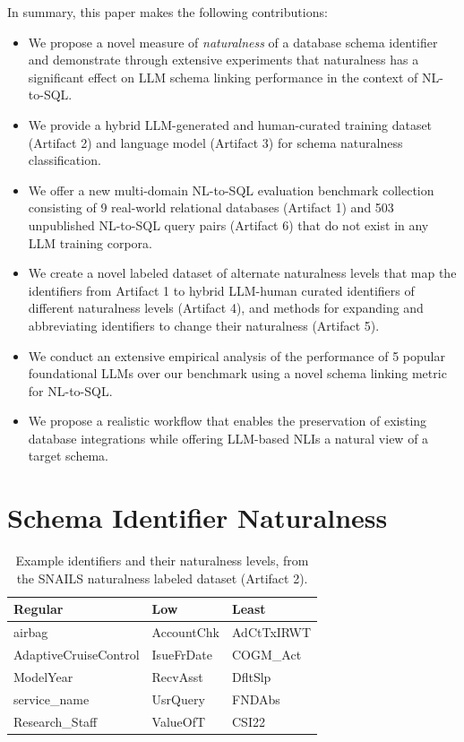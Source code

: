 In summary, this paper makes the following contributions:
\begin{itemize}
  \item We propose a novel measure of \emph{naturalness} of a database schema identifier and demonstrate through extensive experiments that naturalness has a significant effect on LLM schema linking performance in the context of NL-to-SQL.
  \item We provide a hybrid LLM-generated and human-curated training dataset (Artifact 2) and language model (Artifact 3) for schema naturalness classification.
  \item We offer a new multi-domain NL-to-SQL evaluation benchmark collection consisting of 9 real-world relational databases (Artifact 1) and 503 unpublished NL-to-SQL query pairs (Artifact 6) that do not exist in any LLM training corpora.
  \item We create a novel labeled dataset of alternate naturalness levels that map the identifiers from Artifact 1 to hybrid LLM-human curated identifiers of different naturalness levels (Artifact 4), and methods for expanding and abbreviating identifiers to change their naturalness (Artifact 5).
  \item We conduct an extensive empirical analysis of the performance of 5 popular foundational LLMs over our benchmark using a novel schema linking metric for NL-to-SQL.
  \item We propose a realistic workflow that enables the preservation of existing database integrations while offering LLM-based NLIs a natural view of a target schema.
\end{itemize}



\section{Schema Identifier Naturalness}


\begin{table}[t]
  \centering
  \caption{Example identifiers and their naturalness levels, from the SNAILS naturalness labeled dataset (Artifact 2).}
  \begin{tabular}{p{4.5cm}p{3.1cm}p{3.1cm}}
  \toprule
  \textbf{Regular} & \textbf{Low} & \textbf{Least}\\
  \midrule
  airbag & AccountChk & AdCtTxIRWT \\
  AdaptiveCruiseControl & IsueFrDate & COGM\_Act \\
  ModelYear & RecvAsst & DfltSlp \\
  service\_name & UsrQuery & FNDAbs \\
  Research\_Staff & ValueOfT & CSI22 \\
  \bottomrule
  \end{tabular}
  \label{table:nat-cat-examples}
\end{table}

